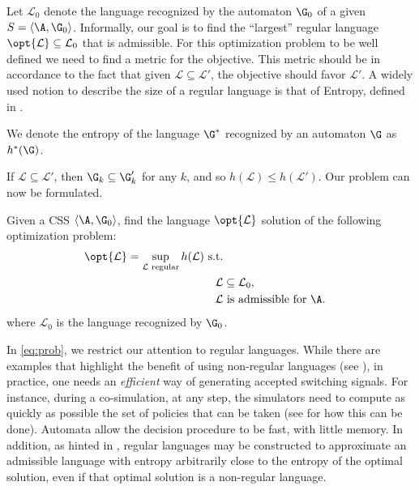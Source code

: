 \documentclass[11pt,twoside,a4paper,openright]{uclouvain-thesis}
\newcommand{\Paths}{\G_k}
\newcommand{\tuple}[1]{\ensuremath{ \left\langle #1 \right\rangle }}
\newcommand{\Lang}{\mathcal{L}}
\newcommand{\LangAutom}[1][\G]{{#1}^*}
\begin{document}
Let $\Lang_0$ denote the language recognized by the automaton $\G_0$ of a given $S = \tuple{\A, \G_0}$.
Informally, our goal is to find the ``largest'' regular language $\opt{\Lang} \subseteq \Lang_0$ that is admissible.
For this optimization problem to be well defined we need to find a metric for the objective.
This metric should be in accordance to the fact that given $\Lang \subseteq \Lang'$, the objective should favor $\Lang'$.
A widely used notion to describe the size of a regular language is that of Entropy, defined in .

We denote the entropy of the language $\LangAutom$ recognized by an automaton $\G$ as $\LangAutom[h](\G)$.

If $\Lang \subseteq \Lang'$, then $\Paths \subseteq \Paths'$ for any $k$, and so $h(\Lang) \leq h(\Lang')$.
Our problem can now be formulated.
\begin{myprob}\label{eq:prob}
  Given a CSS $\tuple{\A, \G_0}$,
  find the language $\opt{\Lang}$ solution of the following optimization problem:
  \begin{align}
\notag
    \opt{\Lang} = \sup_{\Lang \text{ regular}} h(\Lang) \text{ s.t.}\\
\notag
    \Lang & \subseteq \Lang_0,\\
    \label{eq:admissible}
    \Lang & \text{ is admissible for }\A.
  \end{align}
  where $\Lang_0$ is the language recognized by $\G_0$.
\end{myprob}

\begin{myrem}
  In \eqref{eq:prob}, we restrict our attention to regular languages.
  While there are examples that highlight the benefit of using non-regular languages (see ),
  in practice, one needs an \emph{efficient} way of generating accepted switching signals.
	For instance, during a co-simulation, at any step, the simulators need to compute as quickly as possible the set of policies that can be taken (see \cite[Section 4.4]{Gomes2017d} for how this can be done).
  Automata allow the decision procedure to be fast, with little memory.
  In addition, as hinted in , regular languages may be constructed to approximate an admissible language with entropy arbitrarily close to the entropy of the optimal solution, even if that optimal solution is a non-regular language.
\end{myrem}
\end{document}
